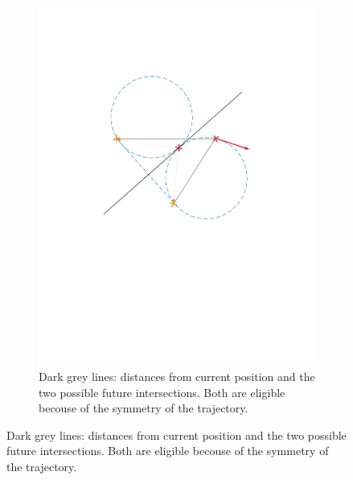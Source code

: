 \begin{figure}[!htbp]
\begin{subfigure}[b]{0.45\textwidth}
        \includegraphics[width=\textwidth]{img/intersection_4.pdf}
        \caption{Dark grey lines: distances from current position and the two possible future intersections. Both are eligible becouse of the symmetry of the trajectory.}
        \label{fig:four}
   \end{subfigure}
   

\end{figure}
